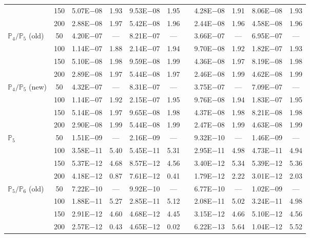 \begin{table}[H]
{\begin{tabular}{@{}l c c c c c c c c c c@{}}
 & 150 & 5.07E$-$08 & 1.93  & 9.53E$-$08 & 1.95 &  & 4.28E$-$08 & 1.91 & 8.06E$-$08 & 1.93\\
 & 200 & 2.88E$-$08 & 1.97  & 5.42E$-$08 & 1.96 &  & 2.44E$-$08 & 1.96 & 4.58E$-$08 & 1.96\\
\midrule
\multirow{4}{*}{$\mathbb{P}_{4}/\mathbb{P}_{5}$ (old)}
 & 50 & 4.20E$-$07 & ---  & 8.21E$-$07 & --- &  & 3.66E$-$07 & --- & 6.95E$-$07 & ---\\
 & 100 & 1.14E$-$07 & 1.88  & 2.14E$-$07 & 1.94 &  & 9.70E$-$08 & 1.92 & 1.82E$-$07 & 1.93\\
 & 150 & 5.10E$-$08 & 1.98  & 9.59E$-$08 & 1.99 &  & 4.36E$-$08 & 1.97 & 8.19E$-$08 & 1.98\\
 & 200 & 2.89E$-$08 & 1.97  & 5.44E$-$08 & 1.97 &  & 2.46E$-$08 & 1.99 & 4.62E$-$08 & 1.99\\
\midrule
\multirow{4}{*}{$\mathbb{P}_{4}/\mathbb{P}_{5}$ (new)}
 & 50 & 4.32E$-$07 & ---  & 8.31E$-$07 & --- &  & 3.75E$-$07 & --- & 7.09E$-$07 & ---\\
 & 100 & 1.14E$-$07 & 1.92  & 2.15E$-$07 & 1.95 &  & 9.76E$-$08 & 1.94 & 1.83E$-$07 & 1.95\\
 & 150 & 5.14E$-$08 & 1.97  & 9.65E$-$08 & 1.98 &  & 4.37E$-$08 & 1.98 & 8.21E$-$08 & 1.98\\
 & 200 & 2.90E$-$08 & 1.99  & 5.44E$-$08 & 1.99 &  & 2.47E$-$08 & 1.99 & 4.63E$-$08 & 1.99\\
\midrule
\multirow{4}{*}{$\mathbb{P}_{5}$}
 & 50 & 1.51E$-$09 & ---  & 2.16E$-$09 & --- &  & 9.32E$-$10 & --- & 1.46E$-$09 & ---\\
 & 100 & 3.58E$-$11 & 5.40  & 5.45E$-$11 & 5.31 &  & 2.95E$-$11 & 4.98 & 4.73E$-$11 & 4.94\\
 & 150 & 5.37E$-$12 & 4.68  & 8.57E$-$12 & 4.56 &  & 3.40E$-$12 & 5.34 & 5.39E$-$12 & 5.36\\
 & 200 & 4.18E$-$12 & 0.87  & 7.61E$-$12 & 0.41 &  & 1.79E$-$12 & 2.22 & 3.01E$-$12 & 2.03\\
\midrule
\multirow{4}{*}{$\mathbb{P}_{5}/\mathbb{P}_{6}$ (old)}
 & 50 & 7.22E$-$10 & ---  & 9.92E$-$10 & --- &  & 6.77E$-$10 & --- & 1.02E$-$09 & ---\\
 & 100 & 1.88E$-$11 & 5.27  & 2.85E$-$11 & 5.12 &  & 2.08E$-$11 & 5.02 & 3.24E$-$11 & 4.98\\
 & 150 & 2.91E$-$12 & 4.60  & 4.68E$-$12 & 4.45 &  & 3.15E$-$12 & 4.66 & 5.10E$-$12 & 4.56\\
 & 200 & 2.57E$-$12 & 0.43  & 4.65E$-$12 & 0.02 &  & 6.22E$-$13 & 5.64 & 1.04E$-$12 & 5.52\\

\end{tabular}}
\end{table}
